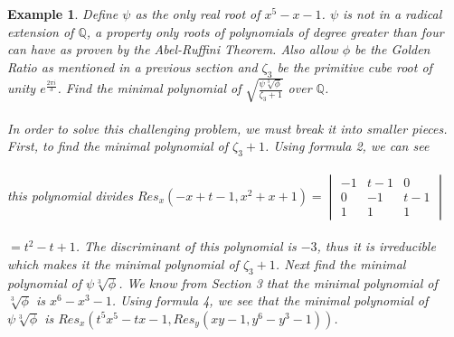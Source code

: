 \documentclass{article}
\newtheorem*{Definition: Sylvester Matrix}{Definition}
\newtheorem*{Definition: Resultant 1}{Definition 1}
\newtheorem*{Definition: Resultant 2}{Definition 2}
\newtheorem*{Theorem: Resultant proves shared roots}{Theorem 1}
\newtheorem*{Theorem: Minimal polynomial for beta}{Theorem 2}
\newtheorem*{Example: Sylvester Matrix Ex}{Example}
\newtheorem*{Theorem: Roots}{Theorem}
\newtheorem*{Corollary: Discriminant}{Corollary}
\newtheorem*{Theorem: Rational Root Theorem}{Theorem}
\newtheorem*{Corollary: Cubic Irreducibility}{Corollary}
\newtheorem*{Theorem: Eisenstein Criterion}{Theorem}
\newtheorem*{Theorem: mod p Test}{Theorem}
\newtheorem*{Theorem: Rabin's algorithm}{Theorem}
\newtheorem*{Theorem: gcd finite field}{Theorem}
\newtheorem*{Theorem: Gauss Irreducibles}{Theorem}
\newtheorem*{Theorem: Number of irreducibles}{Theorem}
\newtheorem*{Example: All irreducibles in Z_2}{Example}
\newtheorem*{Formula: Minimal polynomial for r root of a}{Formula 1}
\newtheorem*{Example: minimal polynomial for sqrt(p)}{Example}
\newtheorem*{Example: Golden Ratio}{Example}
\newtheorem*{Formula: Minimal polynomial for a+b}{Formula 2}
\newtheorem*{Example: 1 + sqrt(3)}{Example}
\newtheorem*{Example: cubic root of unity}{Example}
\newtheorem*{Formula: Minimal polynomial for a/b}{Formula 3}
\newtheorem*{Formula: Minimal polynomial for ab}{Formula 4}
\newtheorem*{Example: cubrt(4)/i+1}{Example}
\newtheorem*{Example: 5zeta}{Example}
\newtheorem*{Example: Wild one}{Example}
\begin{document}
\begin{Example: Wild one}
Define $\psi$ as the only real root of $x^5-x-1$. $\psi$ is not in a radical extension of $\mathbb{Q}$, a property only roots of polynomials of degree greater than four can have as proven by the Abel-Ruffini Theorem. Also allow $\phi$ be the Golden Ratio as mentioned in a previous section and $\zeta_3$ be the primitive cube root of unity $e^{\frac{2 \pi i}{3}}$. Find the minimal polynomial of $\sqrt{\frac{\psi \sqrt[3]{\phi}}{\zeta_3 + 1}}$ over $\mathbb{Q}$.\\\\ 
In order to solve this challenging problem, we must break it into smaller pieces. First, to find the minimal polynomial of $\zeta_3 + 1$. Using formula 2, we can see \\\\
this polynomial divides $Res_x(-x+t-1,x^2+x+1) = \begin{vmatrix} -1 & t-1 & 0 \\ 0 & -1 & t-1 \\ 1 & 1 & 1  \end{vmatrix}$  \\\\
$=t^2-t+1$. The discriminant of this polynomial is $-3$, thus it is irreducible which makes it the minimal polynomial of $\zeta_3 + 1$. Next find the minimal polynomial of $\psi \sqrt[3]{\phi}$. We know from Section 3 that the minimal polynomial of $\sqrt[3]{\phi}$ is $x^6-x^3-1$. Using formula 4, we see that the minimal polynomial of $\psi \sqrt[3]{\phi}$ is $Res_x(t^5x^5-tx-1, Res_y(xy-1, y^6-y^3-1))$. \\\\

\end{Example: Wild one}
\end{document}
